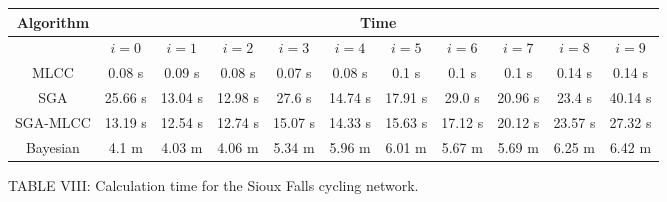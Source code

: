 \documentclass[lettersize,journal]{IEEEtran}
\begin{document}
\begin{figure}[h!]
  
   \begin{minipage}{\textwidth}
    \centering
    \captionsetup{labelformat=empty} %
    \renewcommand{\thetable}{TABLE \arabic{table}} %
    \footnotesize
    \begin{tabular}{|c|c|c|c|c|c|c|c|c|c|c|}
    \hline
    \textbf{Algorithm} & \multicolumn{10}{|c|}{\textbf{Time}} \\ \hline
     & $i = 0$ & $i = 1$ & $i = 2$ & $i = 3$ & $i = 4$ & $i = 5$ & $i = 6$ & $i = 7$ & $i = 8$ & $i = 9$ \\ \hline
 MLCC & 0.08 s & 0.09 s & 0.08 s & 0.07 s & 0.08 s & 0.1 s & 0.1 s & 0.1 s & 0.14 s & 0.14 s \\ \hline
SGA & 25.66 s & 13.04 s & 12.98 s & 27.6 s & 14.74 s & 17.91 s & 29.0 s & 20.96 s & 23.4 s & 40.14 s\\ \hline
SGA-MLCC & 13.19 s & 12.54 s & 12.74 s & 15.07 s & 14.33 s & 15.63 s & 17.12 s & 20.12 s & 23.57 s & 27.32 s \\ \hline
Bayesian & 4.1 m & 4.03 m & 4.06 m & 5.34 m & 5.96 m & 6.01 m & 5.67 m & 5.69 m & 6.25 m & 6.42 m \\ \hline

 
    \end{tabular}
    \caption{TABLE VIII: Calculation time for the Sioux Falls cycling network.}
    \label{sioux_falls_time_table}
  \end{minipage}
\end{figure}
\FloatBarrier
\end{document}

